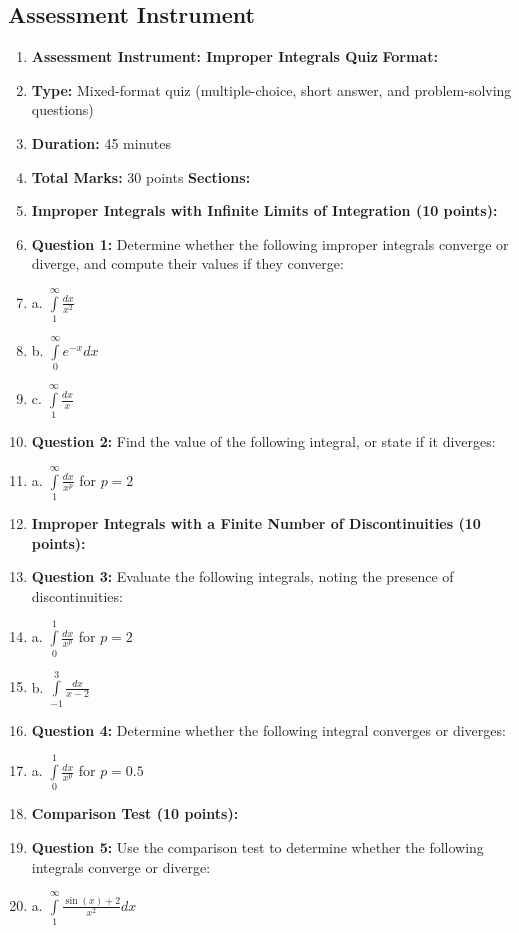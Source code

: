 \subsection{Assessment Instrument}

\begin{enumerate}
    \item \textbf{Assessment Instrument: Improper Integrals Quiz} \textbf{Format:}
    \item \textbf{Type:} Mixed-format quiz (multiple-choice, short answer, and problem-solving questions)
    \item \textbf{Duration:} 45 minutes
    \item \textbf{Total Marks:} 30 points \textbf{Sections:}
    \item \textbf{Improper Integrals with Infinite Limits of Integration (10 points):}
    \item \textbf{Question 1:} Determine whether the following improper integrals converge or diverge, and compute their values if they converge:
    \item a. $\int\limits _1^\infty \frac{dx}{x^2}$
    \item b. $\int\limits _0^\infty e^{-x} dx$
    \item c. $\int\limits _1^\infty \frac{dx}{x}$
    \item \textbf{Question 2:} Find the value of the following integral, or state if it diverges:
    \item a. $\int\limits _1^\infty \frac{dx}{x^p}$ for \( p = 2 \)
    \item \textbf{Improper Integrals with a Finite Number of Discontinuities (10 points):}
    \item \textbf{Question 3:} Evaluate the following integrals, noting the presence of discontinuities:
    \item a. $\int\limits _0^1 \frac{dx}{x^p}$ for \( p = 2 \)
    \item b. $\int\limits _{-1}^3 \frac{dx}{x-2}$
    \item \textbf{Question 4:} Determine whether the following integral converges or diverges:
    \item a. $\int\limits _0^1 \frac{dx}{x^p}$ for \( p = 0.5 \)
    \item \textbf{Comparison Test (10 points):}
    \item \textbf{Question 5:} Use the comparison test to determine whether the following integrals converge or diverge:
    \item a. $\int\limits _1^\infty \frac{\sin(x) + 2}{x^2} dx$

\end{enumerate}
